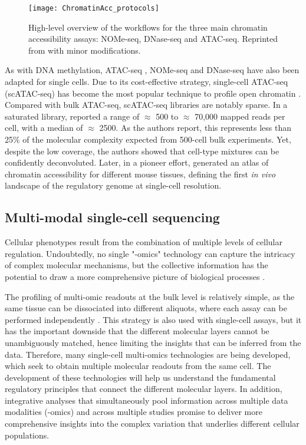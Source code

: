\begin{itemize}
\end{itemize}


\begin{figure}[H]
	\centering
	\texttt{[image: ChromatinAcc\_protocols]}
	\caption[]{High-level overview of the workflows for the three main chromatin accessibility assays: NOMe-seq, DNase-seq and ATAC-seq. Reprinted from \cite{Nordstrom2019} with minor modifications.}
	\label{fig:ChromatinAcc_protocols}
\end{figure}

As with DNA methylation, ATAC-seq \cite{Buenrostro2015a}, NOMe-seq \cite{Pott2016} and DNase-seq \cite{Jin2015} have also been adapted for single cells. Due to its cost-effective strategy, single-cell ATAC-seq (scATAC-seq) has become the most popular technique to profile open chromatin \cite{Cusanovich2015,Cao2018,Chen2018}. Compared with bulk ATAC-seq, scATAC-seq libraries are notably sparse. In a saturated library, \cite{Cusanovich2015} reported a range of $\approx$ 500 to $\approx$ 70,000 mapped reads per cell, with a median of $\approx$ 2500. As the authors report, this represents less than 25\% of the molecular complexity expected from 500-cell bulk experiments. Yet, despite the low coverage, the authors showed that cell-type mixtures can be confidently deconvoluted. Later, in a pioneer effort, \cite{Cusanovich2018b} generated an atlas of chromatin accessibility for different mouse tissues, defining the first \textit{in vivo} landscape of the regulatory genome at single-cell resolution.

\subsection{Multi-modal single-cell sequencing} \label{section:single_cell_multi_modal}

Cellular phenotypes result from the combination of multiple levels of cellular regulation. Undoubtedly, no single "-omics" technology can capture the intricacy of complex molecular mechanisms, but the collective information has the potential to draw a more comprehensive picture of biological processes \cite{Hasin2017,Ritchie2015}.

The profiling of multi-omic readouts at the bulk level is relatively simple, as the same tissue can be dissociated into different aliquots, where each assay can be performed independently \cite{Ritchie2015}. This strategy is also used with single-cell assays, but it has the important downside that the different molecular layers cannot be unambiguously matched, hence limiting the insights that can be inferred from the data. Therefore, many single-cell multi-omics technologies are being developed, which seek to obtain multiple molecular readouts from the same cell. The development of these technologies will help us understand the fundamental regulatory principles that connect the different molecular layers. In addition, integrative analyses that simultaneously pool information across multiple data modalities (-omics) and across multiple studies promise to deliver more comprehensive insights into the complex variation that underlies different cellular populations.

